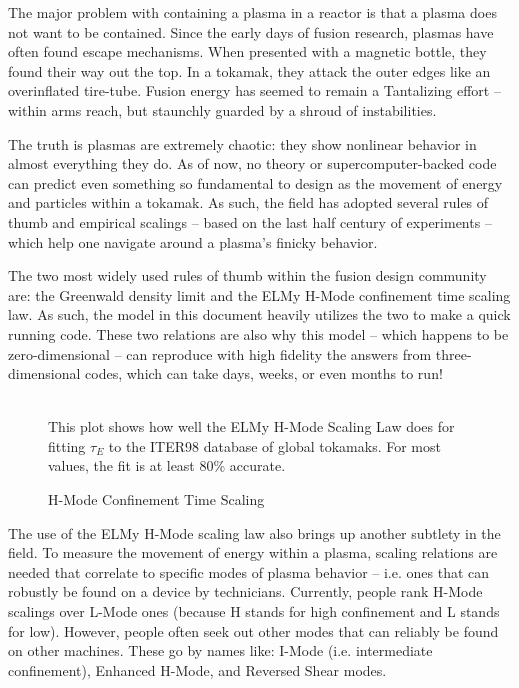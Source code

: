 The major problem with containing a plasma in a reactor is that a plasma does not want to be contained. Since the early days of fusion research, plasmas have often found escape mechanisms. When presented with a magnetic bottle, they found their way out the top. In a tokamak, they attack the outer edges like an overinflated tire-tube. Fusion energy has seemed to remain a Tantalizing effort -- within arms reach, but staunchly guarded by a shroud of instabilities.

The truth is plasmas are extremely chaotic: they show nonlinear behavior in almost everything they do. As of now, no theory or supercomputer-backed code can predict even something so fundamental to design as the movement of energy and particles within a tokamak. As such, the field has adopted several rules of thumb and empirical scalings -- based on the last half century of experiments -- which help one navigate around a plasma's finicky behavior.

The two most widely used rules of thumb within the fusion design community are: the Greenwald density limit and the ELMy H-Mode confinement time scaling law. As such, the model in this document heavily utilizes the two to make a quick running code. These two relations are also why this model -- which happens to be zero-dimensional -- can reproduce with high fidelity the answers from three-dimensional codes, which can take days, weeks, or even months to run!

\begin{figure}
	\centering
	\begin{adjustbox}{width=0.75\textwidth}
		
	\end{adjustbox}
	\caption{H-Mode Confinement Time Scaling} ~\\
	\small This plot shows how well the ELMy H-Mode Scaling Law does for fitting $\tau_E$ to the ITER98 database of global tokamaks. For most values, the fit is at least 80\% accurate.
	\label{fig:elmy}
\end{figure}

The use of the ELMy H-Mode scaling law also brings up another subtlety in the field. To measure the movement of energy within a plasma, scaling relations are needed that correlate to specific modes of plasma behavior -- i.e. ones that can robustly be found on a device by technicians. Currently, people rank H-Mode scalings over L-Mode ones (because H stands for high confinement and L stands for low). However, people often seek out other modes that can reliably be found on other machines. These go by names like: I-Mode (i.e. intermediate confinement), Enhanced H-Mode, and Reversed Shear modes. \cite{imode,enhanced,shear}


